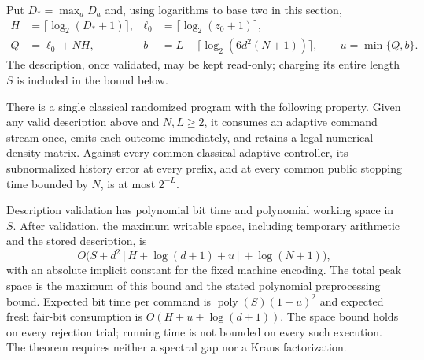 Put $D_* =\max_a D_a$ and, using logarithms to base two in this section,
\begin{align}
 H&=\lceil\log_2(D_*+1)\rceil,&
 \ell_0&=\lceil\log_2(z_0+1)\rceil,\nonumber\\
 Q&=\ell_0+NH,&
 b&=L+\lceil\log_2(6d^2(N+1))\rceil,\qquad
 u=\min\{Q,b\}.\label{eq:uniformparameters66}
\end{align}
The description, once validated, may be kept read-only; charging its
entire length $S$ is included in the bound below.

\begin{theorem}\label{thm:uniformchoi66}
There is a single classical randomized program with the following
property. Given any valid description above and $N,L\ge2$, it consumes
an adaptive command stream once, emits each outcome immediately, and
retains a legal numerical density matrix. Against every common
classical adaptive controller, its subnormalized history error at
every prefix, and at every common public stopping time bounded by
$N$, is at most $2^{-L}$.

Description validation has polynomial bit time and polynomial working
space in $S$. After validation, the maximum writable space, including
temporary arithmetic and the stored description, is
\begin{equation}\label{eq:uniformspace66}
 O\bigl(S+d^2[H+\log(d+1)+u]+\log(N+1)\bigr),
\end{equation}
with an absolute implicit constant for the fixed machine encoding.
The total peak space is the maximum of this bound and the stated
polynomial preprocessing bound. Expected bit time per command is
$\operatorname{poly}(S)(1+u)^2$ and expected fresh fair-bit consumption
is $O(H+u+\log(d+1))$. The space bound holds on every rejection trial;
running time is not bounded on every such execution. The theorem
requires neither a spectral gap nor a Kraus factorization.
\end{theorem}
